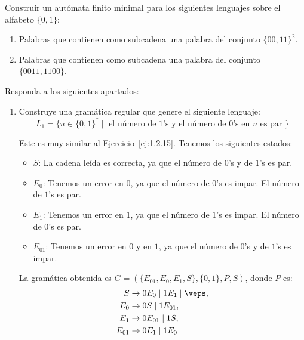 \begin{ejercicio}\label{ej:1.3.21}
    Construir un autómata finito minimal para los siguientes lenguajes sobre el alfabeto $\{0,1\}$:
    \begin{enumerate}
        \item Palabras que contienen como subcadena una palabra del conjunto ${\{00,11\}}^{2}$.
        \item Palabras que contienen como subcadena una palabra del conjunto $\{0011,1100\}$.
    \end{enumerate}
\end{ejercicio}

\begin{ejercicio}\label{ej:1.3.22}
    Responda a los siguientes apartados:
    \begin{enumerate}
        \item Construye una gramática regular que genere el siguiente lenguaje:
            \begin{equation*}
                L_1 = \{u\in {\{0,1\}}^{\ast} \mid \text{ el número de 1's y el número de 0's en } u \text{ es par }\}
            \end{equation*}

            Este es muy similar al Ejercicio~\ref{ej:1.2.15}. Tenemos los siguientes estados:
            \begin{itemize}
                \item \ul{$S$}: La cadena leída es correcta, ya que el número de $0$'s y de $1$'s es par.
                \item \ul{$E_0$}: Tenemos un error en $0$, ya que el número de $0$'s es impar. El número de $1$'s es par.
                \item \ul{$E_1$}: Tenemos un error en $1$, ya que el número de $1$'s es impar. El número de $0$'s es par.
                \item \ul{$E_{01}$}: Tenemos un error en $0$ y en $1$, ya que el número de $0$'s y de $1$'s es impar.
            \end{itemize}
        
            La gramática obtenida es $G=(\{E_{01},E_0,E_1,S\}, \{0, 1\}, P, S)$, donde $P$ es:
            \begin{align*}
                S &\to 0E_0 \mid 1E_1 \mid \veps, \\
                E_0 &\to 0S \mid 1E_{01}, \\
                E_1 &\to 0E_{01} \mid 1S, \\
                E_{01} &\to 0E_1 \mid 1E_0
            \end{align*}


\end{enumerate}
\end{ejercicio}
